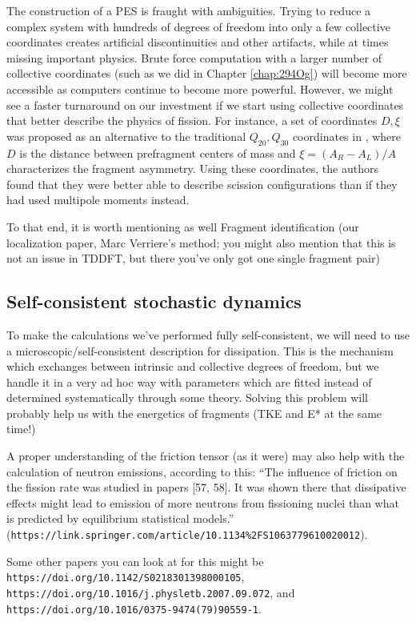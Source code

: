 The construction of a PES is fraught with ambiguities. Trying to reduce a complex system with hundreds of degrees of freedom into only a few collective coordinates creates artificial discontinuities and other artifacts, while at times missing important physics. Brute force computation with a larger number of collective coordinates (such as we did in Chapter \ref{chap:294Og}) will become more accessible as computers continue to become more powerful. However, we might see a faster turnaround on our investment if we start using collective coordinates that better describe the physics of fission. For instance, a set of coordinates $D, \xi$ was proposed as an alternative to the traditional $Q_{20}, Q_{30}$ coordinates in \cite{Younes2012}, where $D$ is the distance between prefragment centers of mass and $\xi = (A_R-A_L)/A$ characterizes the fragment asymmetry. Using these coordinates, the authors found that they were better able to describe scission configurations than if they had used multipole moments instead.

To that end, it is worth mentioning as well Fragment identification (our localization paper, Marc Verriere's method; you might also mention that this is not an issue in TDDFT, but there you've only got one single fragment pair)

\subsection{Self-consistent stochastic dynamics}
To make the calculations we've performed fully self-consistent, we will need to use a microscopic/self-consistent description for dissipation. This is the mechanism which exchanges between intrinsic and collective degrees of freedom, but we handle it in a very ad hoc way with parameters which are fitted instead of determined systematically through some theory. Solving this problem will probably help us with the energetics of fragments (TKE and E* at the same time!)

A proper understanding of the friction tensor (as it were) may also help with the calculation of neutron emissions, according to this: ``The  influence  of  friction  on  the  fission  rate  was studied in papers [57, 58]. It was shown there that dissipative  effects  might  lead  to  emission  of  more  neutrons from fissioning nuclei than what is predicted by equilibrium  statistical  models.'' (\verb|https://link.springer.com/article/10.1134%2FS1063779610020012|).

Some other papers you can look at for this might be \verb|https://doi.org/10.1142/S0218301398000105|, \verb|https://doi.org/10.1016/j.physletb.2007.09.072|, and \verb|https://doi.org/10.1016/0375-9474(79)90559-1|.

